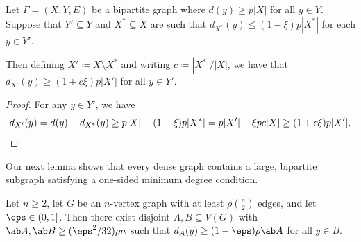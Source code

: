 \begin{lemma}\label{lem:other increment}
    Let $\Gamma = (X,Y,E)$ be a bipartite graph where $d(y)\ge p|X|$ for all $y\in Y$. Suppose that $Y'\subseteq Y$ and $X^*\subseteq X$ are such that $d_{X^*}(y)\le (1-\xi)p|X^*|$ for each $y\in Y'$. 
    
    Then defining $X' \coloneqq X\setminus X^*$ and writing $c \coloneqq |X^*|/|X|$, we have that $d_{X'}(y)\ge (1+c\xi)p|X'|$ for all $y\in Y'$.  
\end{lemma}
\begin{proof}For any $y \in Y'$, we have
\[
d_{X'}(y) = d(y)-d_{X^*}(y) \ge p|X|-(1-\xi)p|X^*|= p|X'|+\xi p c|X| \ge (1+c\xi)p|X'|.\qedhere
\]
\end{proof}
Our next lemma shows that every dense graph contains a large, bipartite subgraph satisfying a one-sided minimum degree condition.
\begin{lemma}\label{lem:dense to bipartite}
    Let $n \geq 2$, let $G$ be an $n$-vertex graph with at least $\rho \binom n2$ edges, and let $\eps\in (0,1]$. Then there exist disjoint $A,B \subseteq V(G)$ with $\ab A, \ab B \geq (\eps^2/32)\rho n$ such that $d_A(y) \geq (1-\eps)\rho \ab A$ for all $y \in B$.
\end{lemma}
